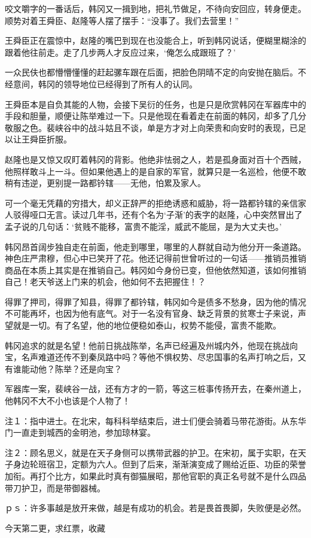 咬文嚼字的一番话后，韩冈又一揖到地，把礼节做足，不待向安回应，转身便走。顺势对着王舜臣、赵隆等人摆了摆手：“没事了。我们去营里！”

王舜臣正在震惊中，赵隆的嘴巴到现在也没能合上，听到韩冈说话，便糊里糊涂的跟着他往前走。走了几步两人才反应过来，‘俺怎么成跟班了？’

一众民伕也都懵懵懂懂的赶起骡车跟在后面，把脸色阴晴不定的向安抛在脑后。不经意间，韩冈的领导地位已经得到了所有人的认同。

王舜臣本是自负其能的人物，会接下吴衍的任务，也是只是欣赏韩冈在军器库中的手段和胆量，顺便让陈举难过一下。只是他现在看着走在前面的韩冈，却多了几分敬服之色。裴峡谷中的战斗姑且不谈，单是方才对上向荣贵和向安时的表现，已足以让王舜臣折服。

赵隆也是又惊又叹盯着韩冈的背影。他绝非怯弱之人，若是孤身面对百十个西贼，他照样敢斗上一斗。但如果他遇上的是自家的军官，就算只是一名巡检，他便不敢稍有违逆，更别提一路都钤辖——无他，怕累及家人。

可一个毫无凭藉的穷措大，却义正辞严的拒绝诱惑和威胁，将一路都钤辖的亲信家人驳得哑口无言。读过几年书，还有个名为‘子渐’的表字的赵隆，心中突然冒出了孟子说的几句话：‘贫贱不能移，富贵不能淫，威武不能屈，是为大丈夫也。’

韩冈昂首阔步独自走在前面，他走到哪里，哪里的人群就自动为他分开一条道路。神色庄严肃穆，但心中已笑开了花。他还记得前世曾听过的一句话——推销员推销商品在本质上其实是在推销自己。韩冈如今身份已变，但他依然知道，该如何推销自己！老天爷送上门来的机会，他如何不去把握住！？

得罪了押司，得罪了知县，得罪了都钤辖，韩冈如今是债多不愁身，因为他的情况不可能再坏，也因为他有底气。对于一名没有官身、缺乏背景的贫寒士子来说，声望就是一切。有了名望，他的地位便稳如泰山，权势不能侵，富贵不能欺。

韩冈追求的就是名望！他前日挑战陈举，名声已经遍及州城内外，他现在挑战向宝，名声难道还传不到秦凤路中吗？等他不惧权势、尽忠国事的名声打响之后，又有谁能动他？陈举？还是向宝？

军器库一案，裴峡谷一战，还有方才的一箭，等这三桩事传扬开去，在秦州道上，他韩冈不大不小也该是个人物了！

注１：指中进士。在北宋，每科科举结束后，进士们便会骑着马带花游街。从东华门一直走到城西的金明池，参加琼林宴。

注２：顾名思义，就是在天子身侧可以携带武器的护卫。在宋初，属于实职，在天子身边轮班宿卫，定额为六人。但到了后来，渐渐演变成了赐给近臣、功臣的荣誉加衔。再打个比方，如果此时真有御猫展昭，那他官职的真正名号就不是什么四品带刀护卫，而是带御器械。

ｐｓ：许多事越是放开来做，越是有成功的机会。若是畏首畏脚，失败便是必然。

今天第二更，求红票，收藏

